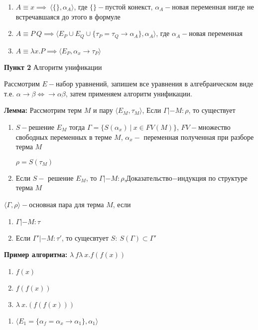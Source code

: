 \documentclass[12pt, a4paper]{article}
\begin{document}
			\begin{enumerate}
				\item $A\equiv x\implies\:\big \langle \{\}, \alpha_A\big\rangle$, где $\{\}-$пустой конекст, $\alpha_A-$новая переменная нигде не встречавшаяся до этого в формуле
				\item $A\equiv P\:Q\implies\big \langle E_P\cup E_Q\cup \{\tau_P=\tau_Q\rightarrow\alpha_A\}, \alpha_A\big \rangle$, где $\alpha_A-$новая переменная
				\item $A\equiv\lambda x.P\implies\big\langle E_P,\alpha_x\rightarrow\tau_P\big\rangle$
			\end{enumerate}
		\textbf{Пункт 2} Алгоритм унификации\par
			Рассмотрим $E-$набор уравнений, запишем все уравнения в алгебраическом виде т.е. $\alpha\rightarrow\beta\Leftrightarrow\rightarrow\alpha\beta$, затем применяем алгоритм унификации.\par
	\textbf{Лемма:} Рассмотрим терм $M$ и пару $\big\langle E_M, \tau_M\big\rangle$, Если $\Gamma|-M:\rho$, то существует 
	\begin{enumerate}
		\item $S-$решение $E_M$ тогда $\Gamma=\{S(\alpha_x)\:|\:x\in FV(M)\}$, $FV-$множество свободных переменных в терме $M$, $\alpha_x-$ переменная полученная при разборе терма $M$\par
		$\rho=S(\tau_M)$
		\item Если $S-$ решение $E_M$, то $\Gamma|-M:\rho$,Доказательство$-$индукция по структуре терма $M$
	\end{enumerate}				
		 $\big \langle\Gamma,\rho\big\rangle-$основная пара для терма $M$, если 
		 \begin{enumerate}
			\item $\Gamma|-M:\tau$
			\item Если $\Gamma'|-M:\tau'$, то сущесвтует $S:\:S(\Gamma)\subset\Gamma'$
		 \end{enumerate}
		 \textbf{Пример алгоритма:}
		 	$\lambda\:f\lambda\:x.f(f(x))$\par
		 	\begin{enumerate}
				\item $f(x)$
				\item $f(f(x))$
				\item $\lambda\:x.(f(f(x)))$		 	
		 	\end{enumerate}
			\begin{enumerate}
				\item $\big\langle E_1=\{\alpha_f=\alpha_x\rightarrow\alpha_1\}, \alpha_1\big\rangle$			
			\end{enumerate}

\end{document}
